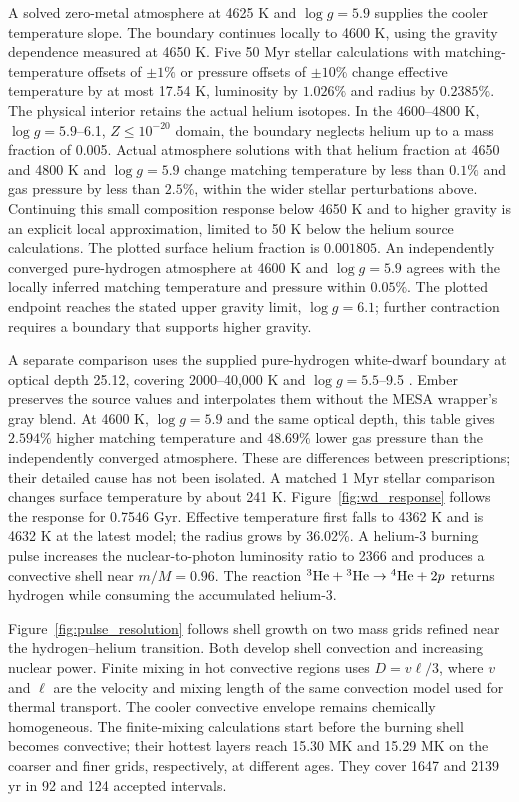 \documentclass[11pt,letterpaper]{article}
\begin{document}
A solved zero-metal atmosphere at 4625 K and $\log g=5.9$ supplies the
cooler temperature slope. The boundary continues locally to 4600 K,
using the gravity dependence measured at 4650 K. Five 50 Myr stellar
calculations with matching-temperature offsets of $\pm1\%$ or pressure
offsets of $\pm10\%$ change effective temperature by at most 17.54 K,
luminosity by $1.026\%$ and radius by $0.2385\%$. The physical interior
retains the actual helium isotopes. In the 4600--4800 K,
$\log g=5.9$--6.1, $Z\leq10^{-20}$ domain, the boundary neglects helium
up to a mass fraction of 0.005. Actual atmosphere solutions with that
helium fraction at 4650 and 4800 K and $\log g=5.9$ change matching
temperature by less than $0.1\%$ and gas pressure by less than $2.5\%$,
within the wider stellar perturbations above. Continuing this small
composition response below 4650 K and to higher gravity is an explicit
local approximation, limited to 50 K below the helium source calculations.
The plotted surface helium fraction is $0.001805$.
An independently converged pure-hydrogen atmosphere at 4600 K and
$\log g=5.9$ agrees with the locally inferred matching temperature and
pressure within $0.05\%$. The plotted endpoint reaches the stated upper
gravity limit, $\log g=6.1$; further contraction requires a boundary that
supports higher gravity.

A separate comparison uses the supplied pure-hydrogen white-dwarf boundary
at optical depth 25.12, covering 2000--40,000 K and
$\log g=5.5$--9.5 \cite{mesa_atm}. Ember preserves the source values and
interpolates them without the MESA wrapper's gray blend. At 4600 K,
$\log g=5.9$ and the same optical depth, this table gives $2.594\%$
higher matching temperature and $48.69\%$ lower gas pressure than the
independently converged atmosphere. These are differences between
prescriptions; their detailed cause has not been isolated.
A matched 1 Myr stellar comparison changes surface temperature by about
241 K. Figure~\ref{fig:wd_response} follows the response for 0.7546 Gyr.
Effective temperature first falls to 4362 K and is 4632 K at the latest
model; the radius grows by 36.02\%. A helium-3 burning pulse increases
the nuclear-to-photon luminosity ratio to 2366 and produces a convective
shell near $m/M=0.96$. The reaction
$^3{\rm He}+{}^3{\rm He}\rightarrow{}^4{\rm He}+2p$ returns hydrogen
while consuming the accumulated helium-3.

Figure~\ref{fig:pulse_resolution} follows shell growth on two mass grids
refined near the hydrogen--helium transition. Both develop shell convection
and increasing nuclear power. Finite mixing in hot convective regions uses
$D=v\ell/3$, where $v$ and $\ell$ are the velocity and mixing length of the
same convection model used for thermal transport. The cooler convective
envelope remains chemically homogeneous. The finite-mixing calculations
start before the burning shell becomes convective; their hottest layers
reach 15.30 MK and 15.29 MK on the coarser and finer grids, respectively,
at different ages. They cover 1647 and 2139 yr in 92 and 124 accepted intervals.
\end{document}

